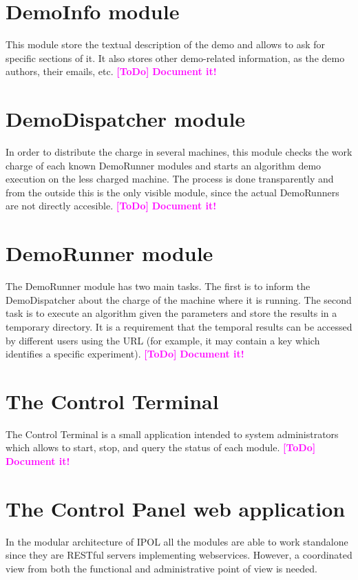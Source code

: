 \documentclass[a4paper,12pt]{article}
\newcommand{\ToDo}[1]{\textcolor{magenta}{\textbf{[ToDo]} \textbf{#1}}}
\begin{document}






\section{DemoInfo module}
This module store the textual description of the demo and allows to ask for specific sections of it. It also stores other demo-related information, as the demo authors, their emails, etc.
\ToDo{Document it!}

\section{DemoDispatcher module}
In order to distribute the charge in several machines, this module checks the work charge of each known DemoRunner modules and starts an algorithm demo execution on the less charged machine. The process is done transparently and from the outside this is the only visible module, since the actual DemoRunners are not directly accesible.
\ToDo{Document it!}

\section{DemoRunner module}
The DemoRunner module has two main tasks. The first is to inform the DemoDispatcher about the charge of the machine where it is running. The second task is to execute an algorithm given the parameters and store the results in a temporary directory. It is a requirement that the temporal results can be accessed by different users using the URL (for example, it may contain a key which identifies a specific experiment).
\ToDo{Document it!}

\section{The Control Terminal}
The Control Terminal is a small application intended to system administrators which allows to start, stop, and query the status of each module.
\ToDo{Document it!}

\section{The Control Panel web application}
In the modular architecture of IPOL all the modules are able to work standalone since they are RESTful servers implementing webservices. However, a coordinated view from both the functional and administrative point of view is needed.
\end{document}
